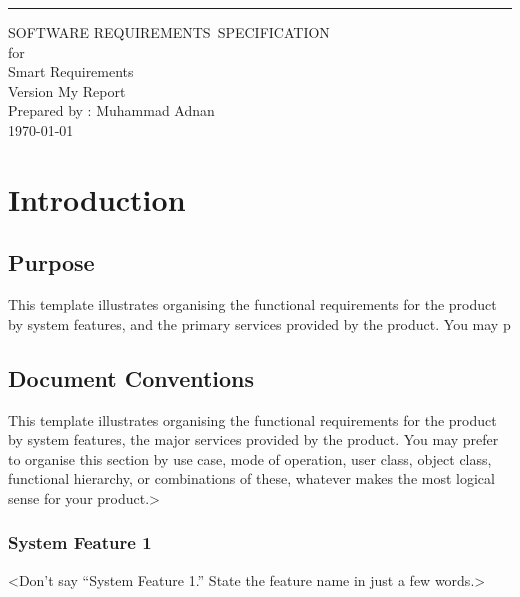\documentclass{scrreprt}
\date{}
\def\myversion{My Report}
\begin{document}
    
    \begin{flushright}
        \rule{16cm}{5pt}\vskip1cm
        \begin{bfseries}
            \Huge{SOFTWARE REQUIREMENTS\ SPECIFICATION}\
            \vspace{1.5cm} 
            \\for\\
            \vspace{1.5cm}
            Smart Requirements\\
            \vspace{1.5cm}
            \LARGE{Version \myversion}\\
            \vspace{1.5cm}
            Prepared by : Muhammad Adnan\\ 
            \vspace{1.5cm}
            \today\
        \end{bfseries}
    \end{flushright}
    
    
    \tableofcontents
    
    \chapter{Introduction} 
    \section{Purpose}
    This template illustrates organising the functional requirements for the product by system features, and the primary services provided by the product. You may p
    \section{Document Conventions} 
    This template illustrates organising the functional requirements for the product by system features, the major services provided by the product. You may prefer to organise this section by use case, mode of operation, user class, object class, functional hierarchy, or combinations of these, whatever makes the most logical sense for your product.>

\subsection*{System Feature 1}

<Don’t say “System Feature 1.” State the feature name in just a few words.>
\end{document}
